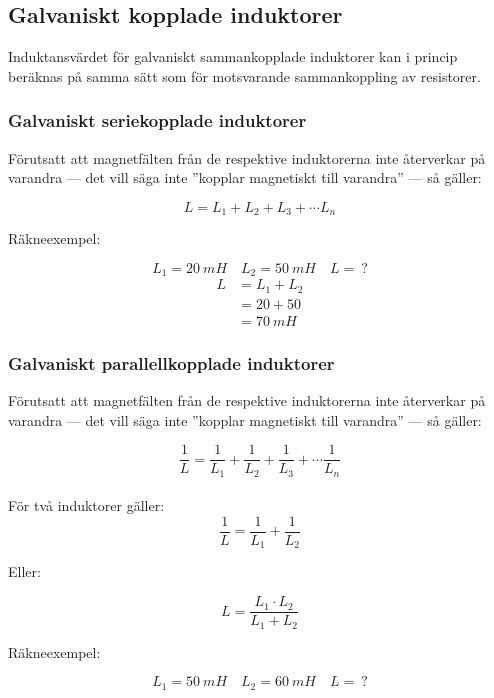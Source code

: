 \subsection{Galvaniskt kopplade induktorer}

Induktansvärdet för galvaniskt sammankopplade induktorer kan i princip
beräknas på samma sätt som för motsvarande sammankoppling av resistorer.

\subsubsection{Galvaniskt seriekopplade induktorer}

Förutsatt att magnetfälten från de respektive induktorerna inte återverkar på
varandra --- det vill säga inte ''kopplar magnetiskt till varandra'' --- så
gäller:

\[L = L_1 + L_2 + L_3 + \cdots L_n\]

\noindent Räkneexempel:

\[L_1 = 20\ mH \quad L_2 = 50\ mH \quad L =\ ?\]
\begin{align*}
  L &= L_1 + L_2 \\
    & = 20 + 50 \\
    &= 70\ mH
\end{align*}

\subsubsection{Galvaniskt parallellkopplade induktorer}

Förutsatt att magnetfälten från de respektive induktorerna inte återverkar på
varandra --- det vill säga inte ''kopplar magnetiskt till varandra'' --- så
gäller:

\[
\frac{1}{L} = \frac{1}{L_1} + \frac{1}{L_2} + \frac{1}{L_3} +
\cdots \frac{1}{L_n}
\]\\[0.25\baselineskip]


För två induktorer gäller:
\[  \frac{1}{L} = \frac{1}{L_1} + \frac{1}{L_2} \]

Eller:

\[ L = \frac{L_1 \cdot L_2}{L_1 + L_2} \]

\noindent Räkneexempel:

\[ L_1 = \SI{50}{mH} \quad L_2 = \SI{60}{mH} \quad L =\ ?   \]


